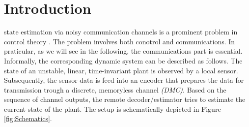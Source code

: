 \documentclass[conference]{IEEEtran}
\begin{document}
\section{Introduction}	\label{sec:Introduction}
	 state estimation via noisy communication channels is a prominent problem in control theory 
	\cite{MS07, MS07SC, S06, SP03}. 
	The problem involves both conotrol and communications. In praticular, as we will see in the following, the communications part is essential.  
	Informally, the corresponding dynamic system can be described as follows. The state of an unstable, linear, time-invariant plant is observed by a local sensor. 
	Subsequently, the sensor data is feed into an encoder that prepares the data for transmission trough a discrete, memoryless channel \emph{(DMC)}. 
	Based on the sequence of channel outputs, the remote decoder/estimator tries to estimate the current state of the plant. The setup is schematically depicted in Figure \ref{fig:Schematics}.
\end{document}
